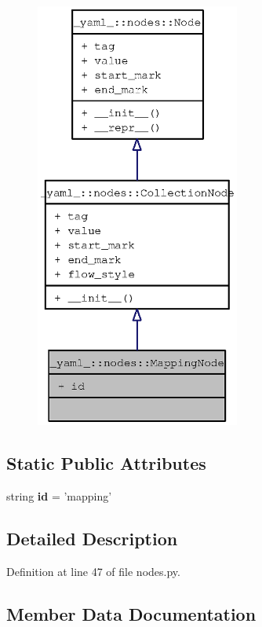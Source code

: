 \begin{figure}[H]
\begin{center}
\leavevmode
\includegraphics[height=400pt]{class__yaml___1_1nodes_1_1MappingNode__coll__graph}
\end{center}
\end{figure}
\subsection*{Static Public Attributes}
\begin{CompactItemize}
\item 
string {\bf id} = 'mapping'
\end{CompactItemize}


\subsection{Detailed Description}


Definition at line 47 of file nodes.py.

\subsection{Member Data Documentation}
